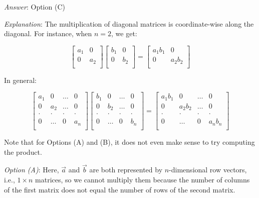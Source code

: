 \documentclass[10pt]{amsart}
\begin{document}
\begin{enumerate}
  {\em Answer}: Option (C)

  {\em Explanation}: The multiplication of diagonal matrices is
  coordinate-wise along the diagonal. For instance, when $n = 2$, we
  get:

  $$\left[\begin{matrix} a_1 & 0 \\ 0 & a_2 \\\end{matrix}\right] \left[\begin{matrix} b_1 & 0 \\ 0 & b_2 \\\end{matrix}\right] = \left[\begin{matrix} a_1b_1 & 0 \\ 0 & a_2b_2 \\\end{matrix}\right]$$

  In general:

  $$\left[\begin{matrix} a_1 & 0 & \dots & 0 \\ 0 & a_2 & \dots & 0 \\ \cdot & \cdot & \cdot & \cdot \\ 0 & \dots & 0 & a_n \\\end{matrix}\right]\left[\begin{matrix} b_1 & 0 & \dots & 0 \\ 0 & b_2 & \dots & 0 \\ \cdot & \cdot & \cdot & \cdot \\ 0 & \dots & 0 & b_n \\\end{matrix}\right] = \left[\begin{matrix} a_1b_1 & 0 & \dots & 0 \\ 0 & a_2b_2 & \dots & 0 \\ \cdot & \cdot & \cdot & \cdot \\ 0 & \dots & 0 & a_nb_n \\\end{matrix}\right]$$

  Note that for Options (A) and (B), it does not even make sense to
  try computing the product.

  {\em Option (A)}: Here, $\vec{a}$ and $\vec{b}$ are both represented
  by $n$-dimensional row vectors, i.e., $1 \times n$ matrices, so we cannot
  multiply them because the number of columns of the first matrix does
  not equal the number of rows of the second matrix.


\end{enumerate}
\end{document}
